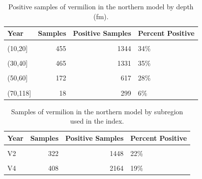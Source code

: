 \documentclass[
  english,
  a4paper,
]{article}
\begin{document}
\begin{table}

\caption{\label{tab:tab-depth-debwv}Positive samples of vermilion in the northern model by depth (fm).}
\centering
\begin{tabular}[t]{lrrl}
\toprule
Year & Samples & Positive Samples & Percent Positive\\
\midrule
\cellcolor{gray!6}{(0,10]} & \cellcolor{gray!6}{113} & \cellcolor{gray!6}{478} & \cellcolor{gray!6}{24\%}\\
(10,20] & 455 & 1344 & 34\%\\
\cellcolor{gray!6}{(20,30]} & \cellcolor{gray!6}{410} & \cellcolor{gray!6}{1198} & \cellcolor{gray!6}{34\%}\\
(30,40] & 465 & 1331 & 35\%\\
\cellcolor{gray!6}{(40,50]} & \cellcolor{gray!6}{347} & \cellcolor{gray!6}{1067} & \cellcolor{gray!6}{33\%}\\
\addlinespace
(50,60] & 172 & 617 & 28\%\\
\cellcolor{gray!6}{(60,70]} & \cellcolor{gray!6}{36} & \cellcolor{gray!6}{263} & \cellcolor{gray!6}{14\%}\\
(70,118] & 18 & 299 & 6\%\\
\bottomrule
\end{tabular}
\end{table}

\begin{table}

\caption{\label{tab:tab-region-debwv}Samples of vermilion in the northern model by subregion used in the index.}
\centering
\begin{tabular}[t]{lrrl}
\toprule
Year & Samples & Positive Samples & Percent Positive\\
\midrule
\cellcolor{gray!6}{V1} & \cellcolor{gray!6}{362} & \cellcolor{gray!6}{1317} & \cellcolor{gray!6}{27\%}\\
V2 & 322 & 1448 & 22\%\\
\cellcolor{gray!6}{V3} & \cellcolor{gray!6}{924} & \cellcolor{gray!6}{1668} & \cellcolor{gray!6}{55\%}\\
V4 & 408 & 2164 & 19\%\\
\bottomrule
\end{tabular}
\end{table}
\end{document}

